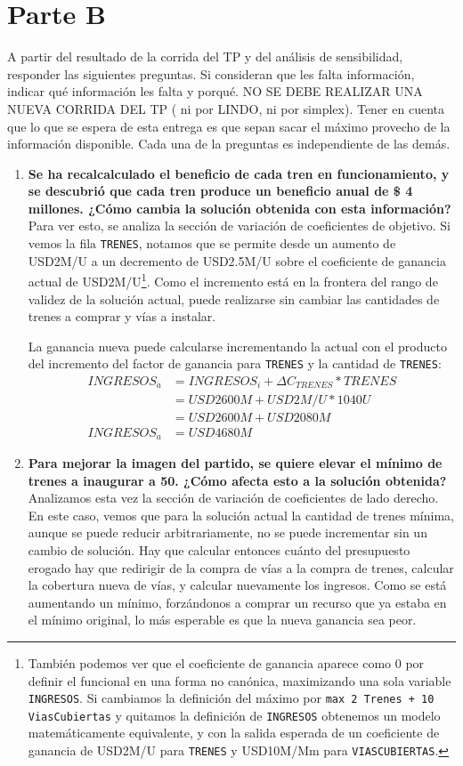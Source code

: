 \documentclass[10pt, a4paper, titlepage,
	oneside,
	fleqn, leqno]{article}
\let\oldsection\section
\def\section{\cleardoublepage\oldsection}
\begin{document}
\section{Parte B}
A partir del resultado de la corrida del TP y del análisis de sensibilidad, responder las siguientes preguntas. Si consideran que les falta información, indicar qué información les falta y porqué. NO SE DEBE REALIZAR UNA NUEVA CORRIDA DEL TP ( ni por LINDO, ni por simplex). Tener en cuenta que lo que se espera de esta entrega es que sepan sacar el máximo provecho de la información disponible. Cada una de la preguntas es independiente de las demás.
\begin{enumerate} [a .]
\item \textbf{Se ha recalcalculado el beneficio de cada tren en funcionamiento, y se descubrió que cada tren produce un beneficio anual de \$ 4 millones. ¿Cómo cambia la solución obtenida con esta información?}\\
	Para ver esto, se analiza la sección de variación de coeficientes de objetivo.
Si vemos la fila \texttt{TRENES}, notamos que se permite desde un aumento de USD2M/U a un decremento de USD2.5M/U sobre el coeficiente de ganancia actual de USD2M/U\footnote{
	También podemos ver que el coeficiente de ganancia aparece como 0 por definir el funcional en una forma no canónica, maximizando una sola variable \texttt{INGRESOS}.
	Si cambiamos la definición del máximo por \texttt{max 2 Trenes + 10 ViasCubiertas} y quitamos la definición de \texttt{INGRESOS} obtenemos un modelo matemáticamente equivalente, y con la salida esperada de un coeficiente de ganancia de USD2M/U para \texttt{TRENES} y USD10M/Mm para \texttt{VIASCUBIERTAS}.}.
Como el incremento está en la frontera del rango de validez de la solución actual, puede realizarse sin cambiar las cantidades de trenes a comprar y vías a instalar.

	La ganancia nueva puede calcularse incrementando la actual con el producto del incremento del factor de ganancia para \texttt{TRENES} y la cantidad de \texttt{TRENES}:
\begin{align*}
	INGRESOS_a &= INGRESOS_i + \Delta C_{TRENES} * TRENES\\
		&= USD2600M + USD2M/U * 1040U\\
		&= USD2600M + USD2080M\\
	INGRESOS_a &= USD4680M
\end{align*}

\item \textbf{Para mejorar la imagen del partido, se quiere elevar el mínimo de trenes a inaugurar a 50. ¿Cómo afecta esto a la solución obtenida?}\\
	Analizamos esta vez la sección de variación de coeficientes de lado derecho.
En este caso, vemos que para la solución actual la cantidad de trenes mínima, aunque se puede reducir arbitrariamente, no se puede incrementar sin un cambio de solución.
Hay que calcular entonces cuánto del presupuesto erogado hay que redirigir de la compra de vías a la compra de trenes, calcular la cobertura nueva de vías, y calcular nuevamente los ingresos.
Como se está aumentando un mínimo, forzándonos a comprar un recurso que ya estaba en el mínimo original, lo más esperable es que la nueva ganancia sea peor.


\end{enumerate}
\end{document}
